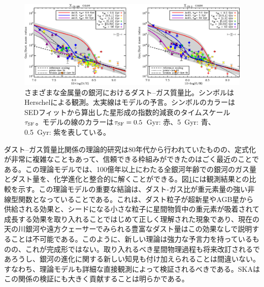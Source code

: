 \begin{figure}[tbp]
\begin{center}
\includegraphics[width=1.0\linewidth]{ISM/c08.s1.ss3.f1.eps}
\caption{
さまざまな金属量の銀河におけるダスト--ガス質量比。シンボルはHerschelによる観測\citep{2014A&A...563A..31R}。太実線はモデルの予言\citep{2013MNRAS.432..637A}。シンボルのカラーはSEDフィットから算出した星形成の指数的減衰のタイムスケール$\tau_{\rm SF}$。モデルの線のカラーは$\tau_{\rm SF} = 0.5$~Gyr: 赤、5~Gyr: 青、0.5~Gyr: 紫を表している。
}\label{c08.s1.ss3.f1}
\end{center}
\end{figure}

ダスト--ガス質量比関係の理論的研究は80年代から行われていたものの、定式化が非常に複雑なこともあって、信頼できる枠組みができたのはごく最近のことである\citep{2013MNRAS.432..637A, 2013EP&S...65..213A, 2014MNRAS.440..134A}。この理論モデルでは、100億年以上にわたる全銀河年齢での銀河のガス量とダスト量を、化学進化と整合的に解くことができる。図\ref{c08.s1.ss3.f1}には観測結果との比較を示す。この理論モデルの重要な結論は、ダスト-ガス比が重元素量の強い非線型関数となっていることである。これは、ダスト粒子が超新星やAGB星から供給される効果と、シードになる小さな粒子に星間物質中の重元素が吸着されて成長する効果を取り入れることではじめて正しく理解された現象であり、現在の天の川銀河や遠方クェーサーでみられる豊富なダスト量はこの効果なしで説明することは不可能である。このように、新しい理論は強力な予言力を持っているものの、これが完成形ではない。取り入れるべき星間物理過程も将来改訂されるであろうし、銀河の進化に関する新しい知見も付け加えられることは間違いない。すなわち、理論モデルも詳細な直接観測によって検証されるべきである。SKAはこの関係の検証にも大きく貢献することは明らかである。

